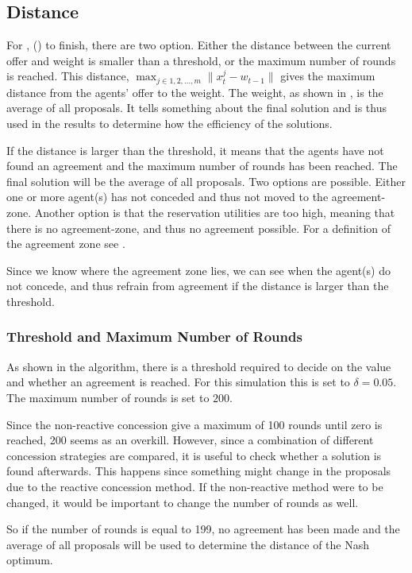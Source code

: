 \subsection{Distance}
For , () to finish, there are two option. Either the distance between the current offer and weight is smaller than a threshold, or the maximum number of rounds is reached. This distance, $ \displaystyle\max_{ j \in {1,2,...,m}} \parallel x^j_t-w_{t-1} \parallel$ gives the maximum distance from the agents' offer to the weight. The weight, as shown in , is the average of all proposals. It tells something about the final solution and is thus used in the results to determine how the efficiency of the solutions.

If the distance is larger than the threshold, it means that the agents have not found an agreement and the maximum number of rounds has been reached. The final solution will be the average of all proposals. Two options are possible. Either one or more agent(s) has not conceded and thus not moved to the agreement-zone. Another option is that the reservation utilities are too high, meaning that there is no agreement-zone, and thus no agreement possible. For a definition of the agreement zone see .

Since we know where the agreement zone lies, we can see when the agent(s) do not concede, and thus refrain from agreement if the distance is larger than the threshold.

\subsubsection{Threshold and Maximum Number of Rounds}
As shown in the algorithm, there is a threshold required to decide on the value and whether an agreement is reached. For this simulation this is set to $\delta = 0.05$.	The maximum number of rounds is set to $200$.

Since the non-reactive concession give a maximum of 100 rounds until zero is reached, 200 seems as an overkill. However, since a combination of different concession strategies are compared, it is useful to check whether a solution is found afterwards. This happens since something might change in the proposals due to the reactive concession method. If the non-reactive method were to be changed, it would be important to change the number of rounds as well. 

So if the number of rounds is equal to 199, no agreement has been made and the average of all proposals will be used to determine the distance of the Nash optimum. 

